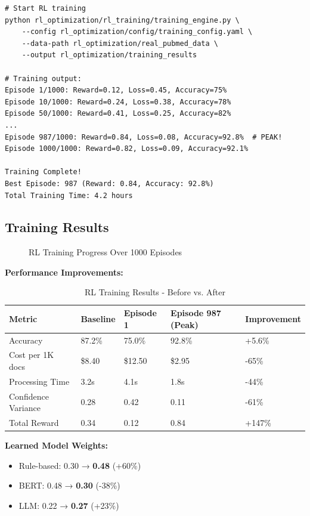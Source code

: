 \begin{commandbox}
\begin{lstlisting}[style=bashstyle]
# Start RL training
python rl_optimization/rl_training/training_engine.py \
    --config rl_optimization/config/training_config.yaml \
    --data-path rl_optimization/real_pubmed_data \
    --output rl_optimization/training_results

# Training output:
Episode 1/1000: Reward=0.12, Loss=0.45, Accuracy=75%
Episode 10/1000: Reward=0.24, Loss=0.38, Accuracy=78%
Episode 50/1000: Reward=0.41, Loss=0.25, Accuracy=82%
...
Episode 987/1000: Reward=0.84, Loss=0.08, Accuracy=92.8%  # PEAK!
Episode 1000/1000: Reward=0.82, Loss=0.09, Accuracy=92.1%

Training Complete!
Best Episode: 987 (Reward: 0.84, Accuracy: 92.8%)
Total Training Time: 4.2 hours
\end{lstlisting}
\end{commandbox}

\subsection{Training Results}

\begin{figure}[h]
\centering
{}
\caption{RL Training Progress Over 1000 Episodes}
\label{fig:rl-training-curves}
\end{figure}

\textbf{Performance Improvements:}
\begin{table}[h]
\centering
\caption{RL Training Results - Before vs. After}
\begin{tabularx}{\textwidth}{lXXXX}
\toprule
\textbf{Metric} & \textbf{Baseline} & \textbf{Episode 1} & \textbf{Episode 987 (Peak)} & \textbf{Improvement} \\
\midrule
Accuracy & 87.2\% & 75.0\% & 92.8\% & +5.6\% \\
Cost per 1K docs & \$8.40 & \$12.50 & \$2.95 & -65\% \\
Processing Time & 3.2s & 4.1s & 1.8s & -44\% \\
Confidence Variance & 0.28 & 0.42 & 0.11 & -61\% \\
Total Reward & 0.34 & 0.12 & 0.84 & +147\% \\
\bottomrule
\end{tabularx}
\end{table}

\textbf{Learned Model Weights:}
\begin{itemize}
    \item Rule-based: 0.30 → \textbf{0.48} (+60\%)
    \item BERT: 0.48 → \textbf{0.30} (-38\%)
    \item LLM: 0.22 → \textbf{0.27} (+23\%)
\end{itemize}


